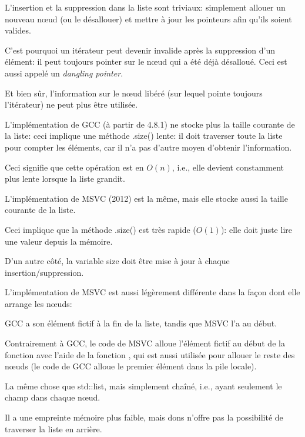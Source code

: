 L'insertion et la suppression dans la liste sont triviaux: simplement allouer un nouveau
n\oe{}ud (ou le désallouer) et mettre à jour les pointeurs afin qu'ils soient valides.

C'est pourquoi un itérateur peut devenir invalide après la suppression d'un élément:
il peut toujours pointer sur le n\oe{}ud qui a été déjà désalloué.
Ceci est aussi appelé un \emph{dangling pointer}.

Et bien sûr, l'information sur le n\oe{}ud libéré (sur lequel pointe toujours l'itérateur)
ne peut plus être utilisée.

L'implémentation de GCC (à partir de 4.8.1) ne stocke plus la taille courante de
la liste: ceci implique une méthode .size() lente: il doit traverser toute la liste
pour compter les éléments, car il n'a pas d'autre moyen d'obtenir l'information.

Ceci signifie que cette opération est en $O(n)$, i.e., elle devient constamment plus
lente lorsque la liste grandit.





\label{MSVC_std_list}

L'implémentation de MSVC (2012) est la même, mais elle stocke aussi la taille courante
de la liste.

Ceci implique que la méthode .size() est très rapide ($O(1)$): elle doit juste lire
une valeur depuis la mémoire.

D'un autre côté, la variable size doit être mise à jour à chaque insertion/suppression.

L'implémentation de MSVC est aussi légèrement différente dans la façon dont elle
arrange les n\oe{}uds:



GCC a son élément fictif à la fin de la liste, tandis que MSVC l'a au début.



Contrairement à GCC, le code de MSVC alloue l'élément fictif au début de la fonction
avec l'aide de la fonction , qui est aussi utilisée pour allouer le reste
des n\oe{}uds (le code de GCC alloue le premier élément dans la pile locale).




La même chose que std::list, mais simplement chaîné, i.e., ayant seulement le champ
 dans chaque n\oe{}ud.

Il a une empreinte mémoire plus faible, mais dons n'offre pas la possibilité de
traverser la liste en arrière.
